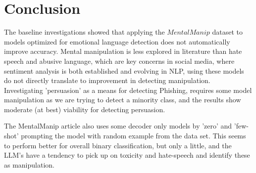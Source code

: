 \documentclass[
	letterpaper, %
	12pt, %
	unnumberedsections, %
	twoside, %
]{LTJournalArticle}
\begin{document}
\section{Conclusion}

The baseline investigations showed that applying the $MentalManip$ dataset to models optimized for emotional language detection does not automatically improve accuracy. Mental manipulation is less explored in literature than hate speech and abusive language, which are key concerns in social media, where sentiment analysis is both established and evolving in NLP, using these models do not directly translate to improvement in detecting manipulation. \\
Investigating 'persuasion' as a means for detecting Phishing, requires some model manipulation as we are trying to detect a minority class, and the results show moderate (at best) viability for detecting persuasion.

The MentalManip article \cite{MentalManip} also uses some decoder only models by 'zero' and 'few-shot' prompting the model with random example from the data set. This seems to perform better for overall binary classification, but only a little, and the LLM's have a tendency to pick up on toxicity and hate-speech and identify these as manipulation.


\clearpage
\onecolumn
\printbibliography %

\appendix
{}
\end{document}
